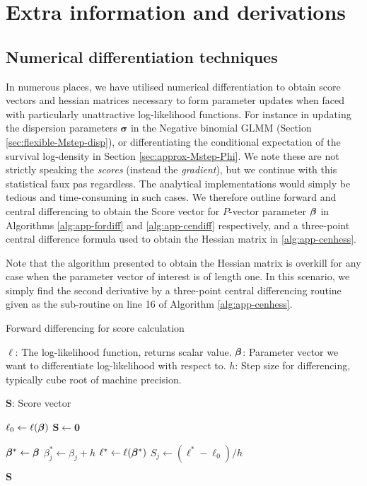 \chapter{Extra information and derivations}\label{cha:appendix-ExtraStuff}
\renewcommand{\thealgorithm}{\Alph{chapter}.\arabic{algorithm}} 

\section{Numerical differentiation techniques}\label{sec:appendix-numdiff}
In numerous places, we have utilised numerical differentiation to obtain score vectors and hessian matrices necessary to form parameter updates when faced with particularly unattractive log-likelihood functions. For instance in updating the dispersion parameters $\bm{\sigma}$ in the Negative binomial GLMM (Section \ref{sec:flexible-Mstep-disp}), or differentiating the conditional expectation of the survival log-density in Section \ref{sec:approx-Mstep-Phi}. We note these are not strictly speaking the \textit{scores} (instead the \textit{gradient}), but we continue with this statistical faux pas regardless. The analytical implementations would simply be tedious and time-consuming in such cases. We therefore outline forward and central differencing to obtain the Score vector for $P$-vector parameter $\bm{\beta}$ in Algorithms \ref{alg:app-fordiff} and \ref{alg:app-cendiff} respectively, and a three-point central difference formula used to obtain the Hessian matrix in \ref{alg:app-cenhess}.

Note that the algorithm presented to obtain the Hessian matrix is overkill for any case when the parameter vector of interest is of length one. In this scenario, we simply find the second derivative by a three-point central differencing routine given as the sub-routine on line 16 of Algorithm \ref{alg:app-cenhess}.

\begin{algorithm}[H]
  \caption{Forward differencing for score calculation}\label{alg:app-fordiff}
  \begin{algorithmic}[1]
    \Require
      \Statex $\ell$: The log-likelihood function, returns scalar value.
      \Statex $\bm{\beta}$: Parameter vector we want to differentiate log-likelihood with respect to.
      \Statex $h$: Step size for differencing, typically cube root of machine precision.

    \Ensure
      \Statex $\bm{S}$: Score vector

    \State $\ell_0 \gets \ell(\bm{\beta})$ 
    \State $\bm{S} \gets \bm{0}$ 

     
      \State $\bm{\beta}^* \gets \bm{\beta}$ 
      \State $\beta^*_j \gets \beta_j + h$ 
      \State $\ell^* \gets \ell(\bm{\beta}^*)$ 
      \State $S_j \gets (\ell^* - \ell_0) / h$

    \EndFor

    \State \Return $\bm{S}$ 
  \end{algorithmic}
\end{algorithm}


